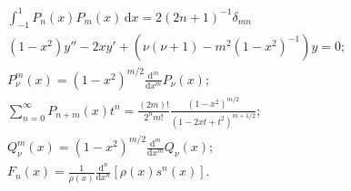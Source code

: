 \documentclass[a4paper,12pt, leqno, answers]{exam}
\begin{document}
\begin{align}
    & \int_{-1}^1 P_n(x) P_m(x) \,\mathrm{d}x = 2 \left( 2n + 1 \right)^{-1} \delta_{mn} \label{eq:legendre_ortog} \\
    & (1 - x^2) y'' - 2 x y' + \left( \nu (\nu + 1) - m^2 (1 - x^2)^{-1} \right) y = 0; \tag{ELA} \label{eq:legendre_ass} \\
    & P_\nu^m(x) = (1 - x^2)^{m/2} \frac{\mathrm{d}^m}{\mathrm{d}x^m}P_\nu(x); \tag{FLA} \label{eq:legendre_ass_ funcao_pri_esp} \\
    & \sum_{n = 0}^\infty P_{n + m}(x) t^n = \frac{(2m)!}{2^n m!} \frac{(1 - x^2)^{m/2}}{(1 - 2 x t + t^2)^{m + 1/2}}; \label{eq:legendre_ass_funcao_geratriz} \\
    & Q_\nu^m(x) = (1 - x^2)^{m/2} \frac{\mathrm{d}^m}{\mathrm{d}x^m}Q_\nu(x); \label{eq:legendre_ass_funcao_seg_esp} \\
    & F_{n}(x) = \frac{1}{\rho(x)} \frac{\mathrm{d}^n}{\mathrm{d} x^n}\left[ \rho(x) s^n(x) \right]. \tag{FR} \label{eq:form_rodrigues}
\end{align}
\end{document}
